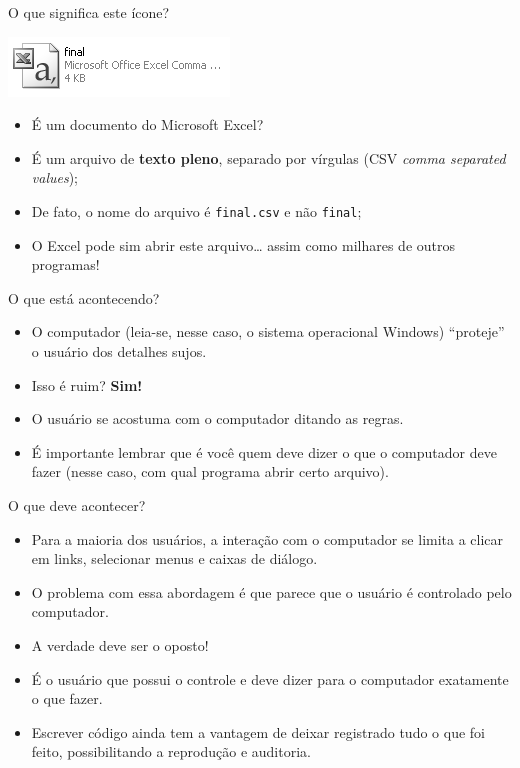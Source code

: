 \documentclass[10pt,a4paper]{book}
\providecommand{\tightlist}{%
  \setlength{\itemsep}{0pt}\setlength{\parskip}{0pt}}
\begin{document}
O que significa este ícone?

\begin{center}\includegraphics[width=0.5\linewidth]{img/excelcsvgrey} \end{center}

\begin{itemize}
\tightlist
\item
  É um documento do Microsoft Excel?
\item
  É um arquivo de \textbf{texto pleno}, separado por vírgulas (CSV
  \emph{comma separated values});
\item
  De fato, o nome do arquivo é \texttt{final.csv} e não \texttt{final};
\item
  O Excel pode sim abrir este arquivo\ldots{} assim como milhares de
  outros programas!
\end{itemize}

O que está acontecendo?

\begin{itemize}
\tightlist
\item
  O computador (leia-se, nesse caso, o sistema operacional Windows)
  ``proteje'' o usuário dos detalhes sujos.
\item
  Isso é ruim? \textbf{Sim!}
\item
  O usuário se acostuma com o computador ditando as regras.
\item
  É importante lembrar que é você quem deve dizer o que o computador
  deve fazer (nesse caso, com qual programa abrir certo arquivo).
\end{itemize}

O que deve acontecer?

\begin{itemize}
\tightlist
\item
  Para a maioria dos usuários, a interação com o computador se limita a
  clicar em links, selecionar menus e caixas de diálogo.
\item
  O problema com essa abordagem é que parece que o usuário é controlado
  pelo computador.
\item
  A verdade deve ser o oposto!
\item
  É o usuário que possui o controle e deve dizer para o computador
  exatamente o que fazer.
\item
  Escrever código ainda tem a vantagem de deixar registrado tudo o que
  foi feito, possibilitando a reprodução e auditoria.
\end{itemize}
\end{document}
